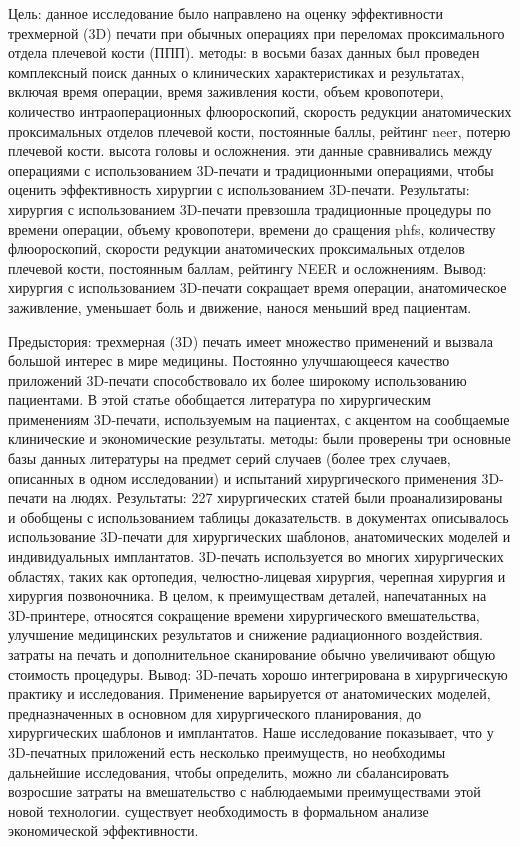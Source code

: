 Цель: данное исследование было направлено на оценку эффективности трехмерной
(3D) печати при обычных операциях при переломах проксимального отдела плечевой
кости (ППП). методы: в восьми базах данных был проведен комплексный поиск данных
о клинических характеристиках и результатах, включая время операции, время
заживления кости, объем кровопотери, количество интраоперационных флюороскопий,
скорость редукции анатомических проксимальных отделов плечевой кости, постоянные
баллы, рейтинг neer, потерю плечевой кости. высота головы и осложнения. эти
данные сравнивались между операциями с использованием 3D-печати и традиционными
операциями, чтобы оценить эффективность хирургии с использованием 3D-печати.
Результаты: хирургия с использованием 3D-печати превзошла традиционные процедуры
по времени операции, объему кровопотери, времени до сращения phfs, количеству
флюороскопий, скорости редукции анатомических проксимальных отделов плечевой
кости, постоянным баллам, рейтингу NEER и осложнениям. Вывод: хирургия с
использованием 3D-печати сокращает время операции, анатомическое заживление,
уменьшает боль и движение, нанося меньший вред пациентам.\cite{34997257}

Предыстория: трехмерная (3D) печать имеет множество применений и вызвала большой
интерес в мире медицины. Постоянно улучшающееся качество приложений 3D-печати
способствовало их более широкому использованию пациентами. В этой статье
обобщается литература по хирургическим применениям 3D-печати, используемым на
пациентах, с акцентом на сообщаемые клинические и экономические результаты.
методы: были проверены три основные базы данных литературы на предмет серий
случаев (более трех случаев, описанных в одном исследовании) и испытаний
хирургического применения 3D-печати на людях. Результаты: 227 хирургических
статей были проанализированы и обобщены с использованием таблицы доказательств.
в документах описывалось использование 3D-печати для хирургических шаблонов,
анатомических моделей и индивидуальных имплантатов. 3D-печать используется во
многих хирургических областях, таких как ортопедия, челюстно-лицевая хирургия,
черепная хирургия и хирургия позвоночника. В целом, к преимуществам деталей,
напечатанных на 3D-принтере, относятся сокращение времени хирургического
вмешательства, улучшение медицинских результатов и снижение радиационного
воздействия. затраты на печать и дополнительное сканирование обычно увеличивают
общую стоимость процедуры. Вывод: 3D-печать хорошо интегрирована в хирургическую
практику и исследования. Применение варьируется от анатомических моделей,
предназначенных в основном для хирургического планирования, до хирургических
шаблонов и имплантатов. Наше исследование показывает, что у 3D-печатных
приложений есть несколько преимуществ, но необходимы дальнейшие исследования,
чтобы определить, можно ли сбалансировать возросшие затраты на вмешательство с
наблюдаемыми преимуществами этой новой технологии. существует необходимость в
формальном анализе экономической эффективности.\cite{27769304}

